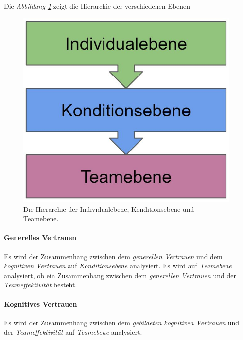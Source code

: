 \documentclass[a4paper,11pt]{article}%
\renewcommand{\\}{\vspace*{0.5\baselineskip} \newline}
\begin{document}
Die \textit{Abbildung \ref{DifferentLevels}} zeigt die Hierarchie der verschiedenen Ebenen.

\begin{figure}[H]
		\begin{footnotesize}
		\centering
			\includegraphics[scale=0.4]{Abbildungen/DifferentLevels.JPG}	
			\caption[Die Hierarchieebenen]{Die Hierarchie der Individualebene, Konditionsebene und Teamebene.}
			\label{DifferentLevels}
		\end{footnotesize}
	\end{figure}

\paragraph{Generelles Vertrauen}
Es wird der Zusammenhang zwischen dem \textit{generellen Vertrauen} und dem \textit{kognitiven Vertrauen} auf \textit{Konditionsebene} analysiert.
Es wird auf \textit{Teamebene} analysiert, ob ein Zusammenhang zwischen dem \textit{generellen Vertrauen} und der \textit{Teameffektivität} besteht.

\paragraph{Kognitives Vertrauen}
Es wird der Zusammenhang zwischen dem \textit{gebildeten kognitiven Vertrauen} und der \textit{Teameffektivität} auf \textit{Teamebene} analysiert.
\end{document}
